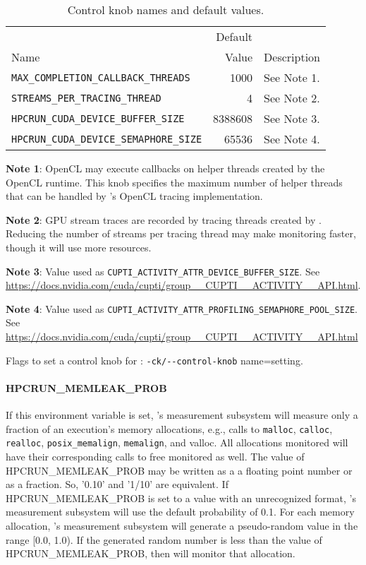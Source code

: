 \begin{table}[t]
\begin{center}
\begin{tabular}{|l|r|p{2in}|}\hline
 & Default & \\
Name & Value & Description \\\hline\hline
\verb|MAX_COMPLETION_CALLBACK_THREADS| & 1000 &  See Note 1.  \\\hline
\verb|STREAMS_PER_TRACING_THREAD| &  4  & See Note 2.  \\\hline
\verb|HPCRUN_CUDA_DEVICE_BUFFER_SIZE| & 8388608 & See Note 3.  \\\hline
\verb|HPCRUN_CUDA_DEVICE_SEMAPHORE_SIZE| & 65536 & See Note 4. \\\hline
\hline
\end{tabular}
\begin{flushleft}
{\bf Note 1}:  OpenCL may execute callbacks on helper threads created by the OpenCL runtime. This knob specifies the maximum number of helper threads that can be handled by \hpcrun{}'s OpenCL tracing implementation.

{\bf Note 2}: GPU stream traces are recorded by tracing threads created by \hpcrun{}. Reducing the number of streams per \hpcrun{} tracing thread may make monitoring faster, though it will use more resources.

{\bf Note 3}: Value used as {\tt CUPTI\_ACTIVITY\_ATTR\_DEVICE\_BUFFER\_SIZE}. See \url{https://docs.nvidia.com/cuda/cupti/group__CUPTI__ACTIVITY__API.html}.

{\bf Note 4}: Value used as \verb|CUPTI_ACTIVITY_ATTR_PROFILING_SEMAPHORE_POOL_SIZE|. See \url{https://docs.nvidia.com/cuda/cupti/group__CUPTI__ACTIVITY__API.html} 
\end{flushleft}
\caption{Control knob names and default values.}
\label{knob-names}
\end{center}
\end{table}

\parg
Flags to set a control knob for \hpcrun: \verb|-ck/--control-knob|  name=setting.


\paragraph{HPCRUN\_MEMLEAK\_PROB}

If this environment variable is set, \HPCToolkit's measurement
subsystem will measure only a fraction of an execution’s memory
allocations, e.g., calls to \verb|malloc|, \verb|calloc|, \verb|realloc|,
\verb|posix_memalign|, \verb|memalign|, and valloc. All allocations
monitored will have their corresponding calls to free monitored as
well. The value of HPCRUN\_MEMLEAK\_PROB may be written as a a
floating point number or as a fraction.  So, '0.10' and '1/10' are
equivalent. If HPCRUN\_MEMLEAK\_PROB is set to a value with an
unrecognized format, \HPCToolkit's measurement subsystem will use the
default probability of 0.1. For each memory allocation, \HPCToolkit's
measurement subsystem will generate a pseudo-random value in the range
[0.0, 1.0). If the generated random number is less than the value
of HPCRUN\_MEMLEAK\_PROB, then \HPCToolkit{} will monitor that
allocation.

